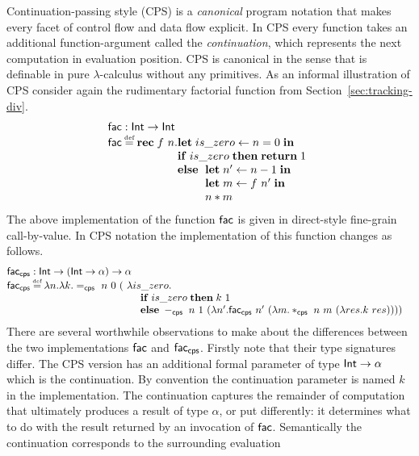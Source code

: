 \documentclass[12pt,phd,lfcs,twoside,openright,logo,leftchapter,normalheadings]{infthesis}
\theoremstyle{plain}
\theoremstyle{definition}
\begin{document}
Continuation-passing style (CPS) is a \emph{canonical} program
notation that makes every facet of control flow and data flow
explicit. In CPS every function takes an additional function-argument
called the \emph{continuation}, which represents the next computation
in evaluation position. CPS is canonical in the sense that is
definable in pure $\lambda$-calculus without any primitives. As an
informal illustration of CPS consider again the rudimentary factorial
function from Section~\ref{sec:tracking-div}.
%
\[
  \bl
    \dec{fac} : \Int \to \Int\\
    \dec{fac} \defas \Rec\;f~n.
       \ba[t]{@{}l}
         \Let\;is\_zero \revto n = 0\;\In\\
         \If\;is\_zero\;\Then\; \Return\;1\\
         \Else\;\ba[t]{@{~}l}
                   \Let\; n' \revto n - 1 \;\In\\
                   \Let\; m \revto f~n' \;\In\\
                   n * m
                 \ea
       \ea
  \el
\]
%
The above implementation of the function $\mathsf{fac}$ is given in
direct-style fine-grain call-by-value. In CPS notation the
implementation of this function changes as follows.
%
\[
  \bl
  \dec{fac}_{\dec{cps}} : \Int \to (\Int \to \alpha) \to \alpha\\
  \dec{fac}_{\dec{cps}} \defas \lambda n.\lambda k.
     =_{\dec{cps}}~n~0~
       (\ba[t]{@{~}l}
          \lambda is\_zero.\\
          \quad\ba[t]{@{~}l}
          \If\;is\_zero\;\Then\; k~1\\
          \Else\;
          -_{\dec{cps}}~n~1~
            (\lambda n'.
               \dec{fac}_{\dec{cps}}~n'~
                  (\lambda m. *_{\dec{cps}}~n~m~
                  (\lambda res. k~res))))
          \ea
        \ea
  \el
\]
%
%
There are several worthwhile observations to make about the
differences between the two implementations $\mathsf{fac}$ and
$\mathsf{fac}_{\mathsf{cps}}$.
%
Firstly note that their type signatures differ. The CPS version has an
additional formal parameter of type $\mathsf{Int} \to \alpha$ which is the
continuation. By convention the continuation parameter is named $k$ in
the implementation. The continuation captures the remainder of
computation that ultimately produces a result of type $\alpha$, or put
differently: it determines what to do with the result returned by an
invocation of $\mathsf{fac}$. Semantically the continuation corresponds
to the surrounding evaluation
\end{document}
